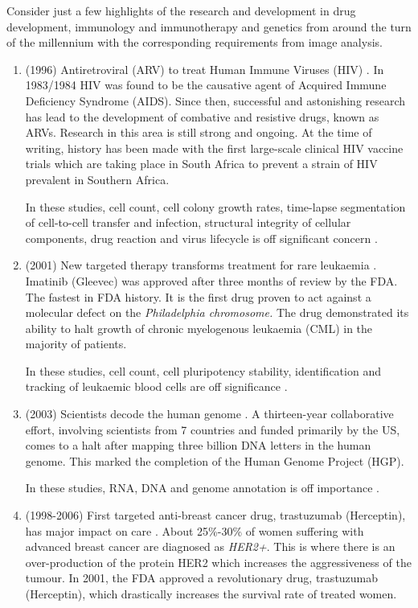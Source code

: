 Consider just a few highlights of the research and development in drug development, immunology and immunotherapy and genetics from around the turn of the millennium with the corresponding requirements from image analysis.
\begin{enumerate}
	\item (1996) Antiretroviral (ARV) to treat Human Immune Viruses (HIV) \citep{Lange2014}. 
	In 1983/1984 HIV was found to be the causative agent of Acquired Immune Deficiency Syndrome (AIDS). Since then, successful and astonishing research has lead to the development of combative and resistive drugs, known as ARVs. Research in this area is still strong and ongoing. At the time of writing, history has been made with the first large-scale clinical HIV vaccine trials which are taking place in South Africa to prevent a strain of HIV prevalent in Southern Africa.
	
	In these studies, cell count, cell colony growth rates, time-lapse segmentation of cell-to-cell transfer and infection, structural integrity of cellular components, drug reaction and virus lifecycle is off significant concern \citep{Chiang2007,Felts2010,Dale2011,Hunt2003}.
	
	\item (2001) New targeted therapy transforms treatment for rare leukaemia  \citep{Druker2001}.
	Imatinib (Gleevec) was approved after three months of review by the FDA. The fastest in FDA history. It is the first drug proven to act against a molecular defect on the \textit{Philadelphia chromosome.} The drug demonstrated its ability to halt growth of chronic myelogenous leukaemia  (CML) in the majority of patients.
	
	In these studies, cell count, cell pluripotency stability, identification and tracking of leukaemic blood cells are off significance \citep{Khashman2010,Viswanathan2015,Mohapatra2011}.
	
	\item (2003) Scientists decode the human genome \citep{HGP2013}. A thirteen-year collaborative effort, involving scientists from 7 countries and funded primarily by the US, comes to a halt after mapping three billion DNA letters in the human genome. This marked the completion of the Human Genome Project (HGP).
	
	In these studies, RNA, DNA and genome annotation is off importance \citep{Steiner2012,Zhou2005}.
	
	\item (1998-2006) First targeted anti-breast cancer drug, trastuzumab (Herceptin), has major impact on care \citep{Slamon2001}. About 25\%-30\% of women suffering with advanced breast cancer are diagnosed as \textit{HER2+}. This is where there is an over-production of the protein HER2 which increases the aggressiveness of the tumour. In 2001, the FDA approved a revolutionary drug, trastuzumab (Herceptin), which drastically increases the survival rate of treated women.


\end{enumerate}
